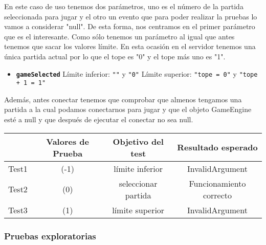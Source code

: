 \begin{enumerate}
En este caso de uso tenemos dos parámetros, uno es el número de la partida seleccionada para jugar y el otro un evento que para poder realizar la pruebas lo vamos a considerar "null". De esta forma, nos centramos en el primer parámetro que es el interesante. Como sólo tenemos un parámetro al igual que antes tenemos que sacar los valores límite. En esta ocasión en el servidor tenemos una única partida actual por lo que el tope es "0" y el tope más uno es "1".

\begin{itemize}
\item \textbf{\texttt{gameSelected}}
\subitem Límite inferior: \texttt{""} y \texttt{"0"}
\subitem Límite superior: \texttt{"tope = 0"} y \texttt{"tope + 1 = 1"}
\end{itemize}

Además, antes conectar tenemos que comprobar que almenos tengamos una partida a la cual podamos conectarnos para jugar y que el objeto GameEngine esté a null y que después de ejecutar el conectar no sea null.

{\footnotesize
\begin{longtable}[c]{lccc}
 & \textbf{Valores de Prueba} & \textbf{Objetivo del test} & \textbf{Resultado esperado} \\
\hline \hline
\endhead

Test1 & (-1) & límite inferior & InvalidArgument\\
Test2 & (0) & seleccionar partida & Funcionamiento correcto\\
Test3 & (1) & límite superior & InvalidArgument\\

\hline
\end{longtable}
}

\end{enumerate}

\subsubsection{Pruebas exploratorias}

